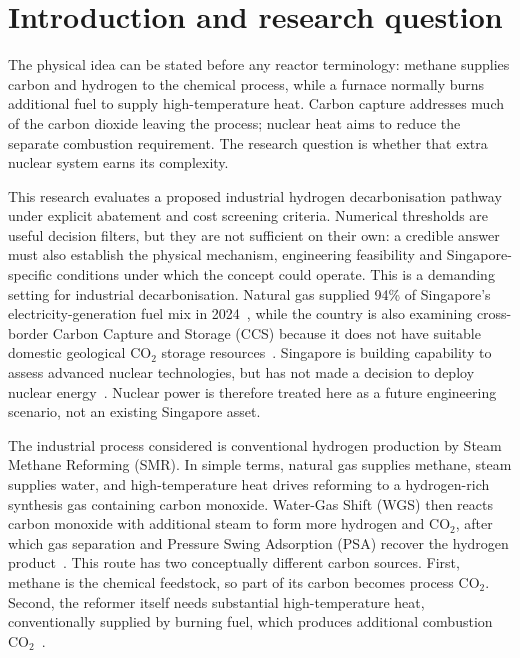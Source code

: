 \section{Introduction and research question}


The physical idea can be stated before any reactor terminology: methane supplies carbon and hydrogen to the chemical process, while a furnace normally burns additional fuel to supply high-temperature heat. Carbon capture addresses much of the carbon dioxide leaving the process; nuclear heat aims to reduce the separate combustion requirement. The research question is whether that extra nuclear system earns its complexity.

This research evaluates a proposed industrial hydrogen decarbonisation pathway under explicit abatement and cost screening criteria. Numerical thresholds are useful decision filters, but they are not sufficient on their own: a credible answer must also establish the physical mechanism, engineering feasibility and Singapore-specific conditions under which the concept could operate. This is a demanding setting for industrial decarbonisation. Natural gas supplied 94\% of Singapore's electricity-generation fuel mix in 2024~\cite{ema2024context}, while the country is also examining cross-border Carbon Capture and Storage (CCS) because it does not have suitable domestic geological CO$_2$ storage resources~\cite{mti2025carbon}. Singapore is building capability to assess advanced nuclear technologies, but has not made a decision to deploy nuclear energy~\cite{mti2025nuclear,mti2026inir}. Nuclear power is therefore treated here as a future engineering scenario, not an existing Singapore asset.

The industrial process considered is conventional hydrogen production by Steam Methane Reforming (SMR). In simple terms, natural gas supplies methane, steam supplies water, and high-temperature heat drives reforming to a hydrogen-rich synthesis gas containing carbon monoxide. Water-Gas Shift (WGS) then reacts carbon monoxide with additional steam to form more hydrogen and CO$_2$, after which gas separation and Pressure Swing Adsorption (PSA) recover the hydrogen product~\cite{ieaghg2017smr}. This route has two conceptually different carbon sources. First, methane is the chemical feedstock, so part of its carbon becomes process CO$_2$. Second, the reformer itself needs substantial high-temperature heat, conventionally supplied by burning fuel, which produces additional combustion CO$_2$~\cite{ieaghg2017smr}.

